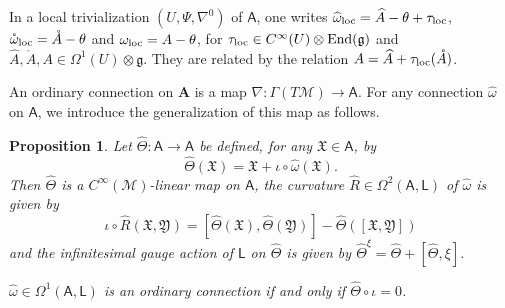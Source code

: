 \documentclass[number]{elsarticle}
\newtheorem{proposition}[theorem]{Proposition}
\theoremstyle{definition}
\theoremstyle{remark}
\numberwithin{equation}{section}
\begin{document}
In a local trivialization $(U,\Psi,\nabla^0)$ of ${{{{\mathbf{\mathsf{{A}}}}}}}$, one writes ${\widehat{\omega}}_{{\text{\textup{loc}}}} = {{\widehat{A}}} - \theta + {\tau}_{{\text{\textup{loc}}}}$, ${{\mathring{{\omega}}}}_{{\text{\textup{loc}}}} = {{\mathring{{A}}}} - \theta$ and $\omega_{{\text{\textup{loc}}}} = A - \theta$, for ${\tau}_{{\text{\textup{loc}}}} \in C^\infty(U) \otimes \operatorname{End}({{\mathfrak g}})$ and ${{\widehat{A}}}, {{\mathring{{A}}}}, A \in \Omega^1(U) \otimes {{\mathfrak g}}$. They are related by the relation $A = {{\widehat{A}}} + {\tau}_{{\text{\textup{loc}}}}({{\mathring{{A}}}})$.

An ordinary connection on ${{{{\mathbf{{A}}}}}}$ is a map $\nabla : \Gamma(T{{{{\mathcal{{M}}}}}}) \rightarrow {{{{\mathbf{\mathsf{{A}}}}}}}$. For any connection ${\widehat{\omega}}$ on ${{{{\mathbf{\mathsf{{A}}}}}}}$, we introduce the generalization of this map as follows.

\begin{proposition}
\label{genconn}
Let ${{\widehat{\Theta}}} : {{{{\mathbf{\mathsf{{A}}}}}}} \rightarrow {{{{\mathbf{\mathsf{{A}}}}}}}$ be defined, for any ${{\mathfrak X}} \in {{{{\mathbf{\mathsf{{A}}}}}}}$, by
\begin{equation}
{{\widehat{\Theta}}}({{\mathfrak X}}) = {{\mathfrak X}} + \iota \circ {\widehat{\omega}}({{\mathfrak X}}).
\end{equation}
Then ${{\widehat{\Theta}}}$ is a $C^\infty({{{{\mathcal{{M}}}}}})$-linear map on ${{{{\mathbf{\mathsf{{A}}}}}}}$, the curvature ${\widehat{R}} \in \Omega^2({{{{\mathbf{\mathsf{{A}}}}}}},{{{{\mathbf{\mathsf{{L}}}}}}})$ of ${\widehat{\omega}}$ is given by
\begin{equation}
\iota\circ {\widehat{R}}({{\mathfrak X}}, {{\mathfrak Y}}) = [{{\widehat{\Theta}}}({{\mathfrak X}}),{{\widehat{\Theta}}}({{\mathfrak Y}})] - {{\widehat{\Theta}}}([{{\mathfrak X}},{{\mathfrak Y}}])
\end{equation}
and the infinitesimal gauge action of ${{{{\mathbf{\mathsf{{L}}}}}}}$ on ${{\widehat{\Theta}}}$ is given by ${{\widehat{\Theta}}}^\xi = {{\widehat{\Theta}}} + [{{\widehat{\Theta}}},\xi]$.

${\widehat{\omega}}\in\Omega^1({{{{\mathbf{\mathsf{{A}}}}}}},{{{{\mathbf{\mathsf{{L}}}}}}})$ is an ordinary connection if and only if ${{\widehat{\Theta}}} \circ \iota=0$.
\end{proposition}
\end{document}
